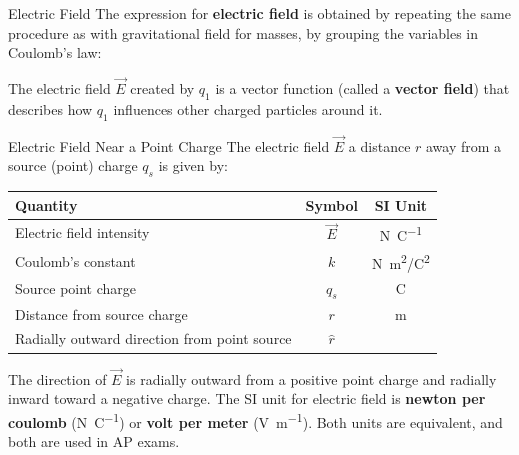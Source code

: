 \documentclass[12pt,aspectratio=169]{beamer}
\begin{document}
\begin{frame}{Electric Field}
  The expression for \textbf{electric field} is obtained by repeating the same
  procedure as with gravitational field for masses, by grouping the variables
  in Coulomb's law:


  The electric field $\vec E$ created by $q_1$ is a vector function (called a
  \textbf{vector field}) that describes how $q_1$ influences other charged
  particles around it.
\end{frame}



\begin{frame}{Electric Field Near a Point Charge}
  The electric field $\vec E$ a distance $r$ away from a source (point) charge
  $q_s$ is given by:

  \begin{center}
    \begin{tabular}{l|c|c}
      \rowcolor{pink}
      \textbf{Quantity} & \textbf{Symbol} & \textbf{SI Unit} \\ \hline
      Electric field intensity    & $\vec E$ & \si{\newton\per\coulomb}\\
      Coulomb's constant          & $k$   & \si{N.m^2/C^2} \\
      Source point charge         & $q_s$   & \si\coulomb \\
      Distance from source charge & $r$ & \si\metre \\
      Radially outward direction from point source & $\hat r$ &
    \end{tabular}
  \end{center}
  The direction of $\vec E$ is radially outward from a positive point charge
  and radially inward toward a negative charge. The SI unit for electric field
  is \textbf{newton per coulomb} (\si{\newton\per\coulomb}) or
  \textbf{volt per meter} (\si{\volt\per\metre}). Both units are equivalent,
  and both are used in AP exams.
\end{frame}
\end{document}

